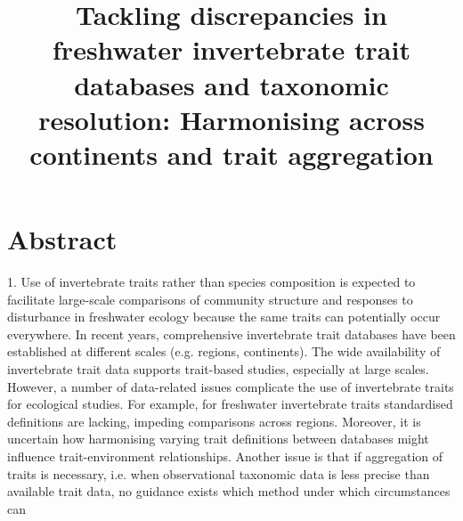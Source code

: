 \documentclass{article}
\title{Tackling discrepancies in freshwater invertebrate trait databases and taxonomic resolution: Harmonising across continents and trait aggregation}
\author{}%
\date{}
\begin{document}
\maketitle


\section*{Abstract}




1. Use of invertebrate traits rather than species composition is expected to facilitate large-scale comparisons of community structure and responses to disturbance in freshwater ecology because the same traits can potentially occur everywhere. %
In recent years, comprehensive invertebrate trait databases have been established at different scales (e.g. regions, continents). The wide availability of invertebrate trait data supports trait-based studies, especially at large scales. However, a number of data-related issues complicate the use of invertebrate traits for ecological studies. For example, for freshwater invertebrate traits standardised definitions are lacking, impeding comparisons across regions. Moreover, it is uncertain how harmonising varying trait definitions between databases might influence trait-environment relationships. Another issue is that if aggregation of traits is necessary, i.e. when observational taxonomic data is less precise than available trait data, no guidance exists which method under which circumstances can 
\end{document}
